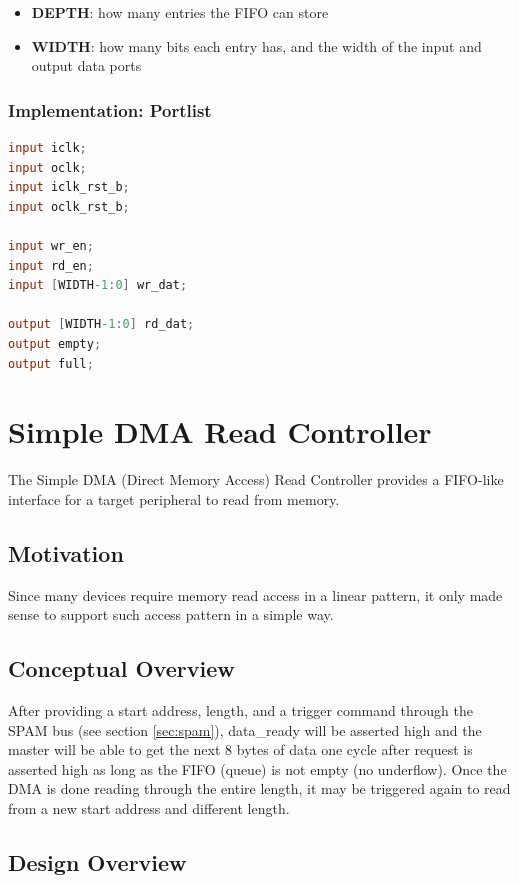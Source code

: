 \documentclass[10pt]{report}
\begin{document}
\begin{itemize}
\item{\textbf{DEPTH}: how many entries the FIFO can store}
\item{\textbf{WIDTH}: how many bits each entry has, and the width of the input and
output data ports}
\end{itemize}

\subsubsection{Implementation: Portlist}
\begin{lstlisting}[basicstyle=\footnotesize,language=Verilog]
input iclk;
input oclk;
input iclk_rst_b;
input oclk_rst_b;
 
input wr_en;
input rd_en;
input [WIDTH-1:0] wr_dat;
 
output [WIDTH-1:0] rd_dat;
output empty;
output full;
\end{lstlisting}

\section{Simple DMA Read Controller}
\label{sec:dmac}

The Simple DMA (Direct Memory Access) Read Controller provides a FIFO-like
interface for a target peripheral to read from memory.

\subsection{Motivation}

Since many devices require memory read access in a linear pattern, it only
made sense to support such access pattern in a simple way.

\subsection{Conceptual Overview}

After providing a start address, length, and a trigger command through the
SPAM bus (see section \ref{sec:spam}), data\_ready will be asserted high and
the master will be able to get the next 8 bytes of data one cycle after
request is asserted high as long as the FIFO (queue) is not empty (no
underflow).  Once the DMA is done reading through the entire length, it may
be triggered again to read from a new start address and different length.

\subsection{Design Overview}
\end{document}
